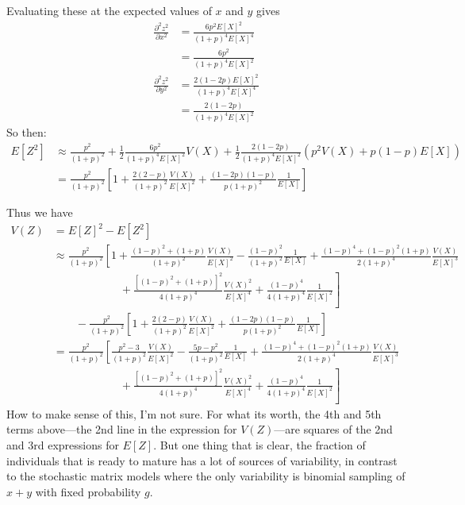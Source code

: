 \documentclass[
]{article}
\begin{document}
Evaluating these at the expected values of \(x\) and \(y\) gives \[
\begin{aligned}
\frac{\partial^2 z^2}{\partial x^2} &= \frac{6p^2 E[X]^2}{(1+p)^4 E[X]^4}\\
    &= \frac{6p^2}{(1+p)^4 E[X]^2}\\
\frac{\partial^2 z^2}{\partial y^2} &= \frac{2(1-2p)E[X]^2}{(1+p)^4 E[X]^4}\\
    &= \frac{2(1-2p)}{(1+p)^4 E[X]^2}
\end{aligned}
\] So then: \[
\begin{aligned}
E[Z^2] &\approx \frac{p^2}{(1+p)^2} + \frac{1}{2}\frac{6p^2}{(1+p)^4 E[X]^2}V(X) + \frac{1}{2}\frac{2(1-2p)}{(1+p)^4 E[X]^2}(p^2 V(X) + p(1-p) E[X])\\
  &= \frac{p^2}{(1+p)^2} \left[1 + \frac{2(2-p)}{(1+p)^2}\frac{V(X)}{E[X]^2} + \frac{(1-2p)(1-p)}{p(1+p)^2} \frac{1}{E[X]} \right]
\end{aligned}
\]

Thus we have \[
\begin{aligned}
V(Z) &= E[Z]^2 - E[Z^2]\\
  &\approx  \frac{p^2}{(1+p)^2} \left[1 + \frac{(1-p)^2 +(1+p)}{(1+p)^2} \frac{V(X)}{E[X]^2} - \frac{(1-p)^2}{(1+p)^2} \frac{1}{E[X]} + \frac{(1-p)^4 +(1-p)^2(1+p)}{2(1+p)^4} \frac{V(X)}{E[X]^3} \right. \\
  & \left. \qquad\qquad\qquad + \frac{[(1-p)^2 +(1+p)]^2}{4(1+p)^4} \frac{V(X)^2}{E[X]^4} + \frac{(1-p)^4}{4(1+p)^4} \frac{1}{E[X]^2} \right] \\
  &  \qquad - \frac{p^2}{(1+p)^2} \left[1 + \frac{2(2-p)}{(1+p)^2}\frac{V(X)}{E[X]^2} + \frac{(1-2p)(1-p)}{p(1+p)^2} \frac{1}{E[X]} \right] \\
  &= \frac{p^2}{(1+p)^2} \left[ \frac{p^2-3}{(1+p)^2} \frac{V(X)}{E[X]^2} - \frac{5p-p^2 }{(1+p)^2} \frac{1}{E[X]} + \frac{(1-p)^4 +(1-p)^2(1+p)}{2(1+p)^4} \frac{V(X)}{E[X]^3} \right. \\
  & \left. \qquad\qquad\qquad  + \frac{[(1-p)^2 +(1+p)]^2}{4(1+p)^4} \frac{V(X)^2}{E[X]^4} + \frac{(1-p)^4}{4(1+p)^4} \frac{1}{E[X]^2}\right]
\end{aligned}
\] How to make sense of this, I'm not sure. For what its worth, the 4th
and 5th terms above---the 2nd line in the expression for \(V(Z)\)---are
squares of the 2nd and 3rd expressions for \(E[Z]\). But one thing that
is clear, the fraction of individuals that is ready to mature has a lot
of sources of variability, in contrast to the stochastic matrix models
where the only variability is binomial sampling of \(x+y\) with fixed
probability \(g\).
\end{document}
